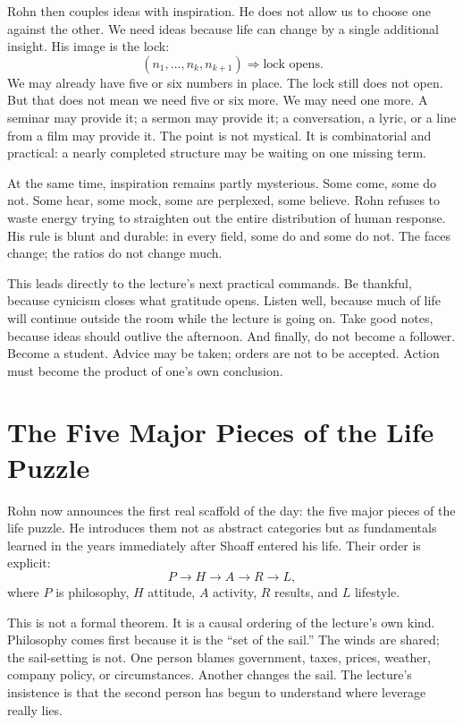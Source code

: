 Rohn then couples ideas with inspiration. He does not allow us to choose one against the other. We need ideas because life can change by a single additional insight. His image is the lock:
\begin{equation}
(n_1,\dots,n_k,n_{k+1}) \Rightarrow \text{lock opens}.
\end{equation}
We may already have five or six numbers in place. The lock still does not open. But that does not mean we need five or six more. We may need one more. A seminar may provide it; a sermon may provide it; a conversation, a lyric, or a line from a film may provide it. The point is not mystical. It is combinatorial and practical: a nearly completed structure may be waiting on one missing term.

At the same time, inspiration remains partly mysterious. Some come, some do not. Some hear, some mock, some are perplexed, some believe. Rohn refuses to waste energy trying to straighten out the entire distribution of human response. His rule is blunt and durable: in every field, some do and some do not. The faces change; the ratios do not change much.

This leads directly to the lecture's next practical commands. Be thankful, because cynicism closes what gratitude opens. Listen well, because much of life will continue outside the room while the lecture is going on. Take good notes, because ideas should outlive the afternoon. And finally, do not become a follower. Become a student. Advice may be taken; orders are not to be accepted. Action must become the product of one's own conclusion.

\section{The Five Major Pieces of the Life Puzzle}

Rohn now announces the first real scaffold of the day: the five major pieces of the life puzzle. He introduces them not as abstract categories but as fundamentals learned in the years immediately after Shoaff entered his life. Their order is explicit:
\begin{equation}
P \to H \to A \to R \to L,
\end{equation}
where \(P\) is philosophy, \(H\) attitude, \(A\) activity, \(R\) results, and \(L\) lifestyle.

This is not a formal theorem. It is a causal ordering of the lecture's own kind. Philosophy comes first because it is the ``set of the sail.'' The winds are shared; the sail-setting is not. One person blames government, taxes, prices, weather, company policy, or circumstances. Another changes the sail. The lecture's insistence is that the second person has begun to understand where leverage really lies.

